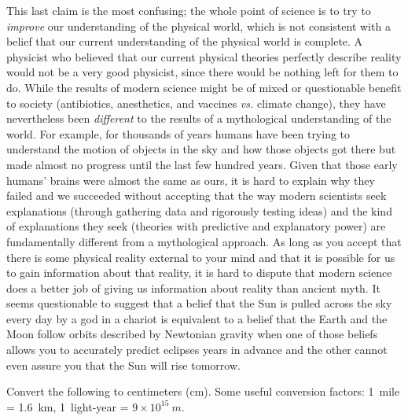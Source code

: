 \documentclass[12pt]{exam}
\begin{document}
\begin{questions}
\begin{TheSolution}
This last claim is the most confusing; the whole point of science is to try to \textit{improve} our understanding of the physical world, which is not consistent with a belief that our current understanding of the physical world is complete. A physicist who believed that our current physical theories perfectly describe reality would not be a very good physicist, since there would be nothing left for them to do.
While the results of modern science might be of mixed or questionable benefit to society (antibiotics, anesthetics, and vaccines \textit{vs.} climate change), they have nevertheless been \textit{different} to the results of a mythological understanding of the world. For example, for thousands of years humans have been trying to understand the motion of objects in the sky and how those objects got there but made almost no progress until the last few hundred years. Given that those early humans' brains were almost the same as ours, it is hard to explain why they failed and we succeeded without accepting that the way modern scientists seek explanations (through gathering data and rigorously testing ideas) and the kind of explanations they seek (theories with predictive and explanatory power) are fundamentally different from a mythological approach. As long as you accept that there is some physical reality external to your mind and that it is possible for us to gain information about that reality, it is hard to dispute that modern science does a better job of giving us information about reality than ancient myth. It seems questionable to suggest that a belief that the Sun is pulled across the sky every day by a god in a chariot is equivalent to a belief that the Earth and the Moon follow orbits described by Newtonian gravity when one of those beliefs allows you to accurately predict eclipses years in advance and the other cannot even assure you that the Sun will rise tomorrow.
\end{TheSolution}

\question
	Convert the following to centimeters (cm). Some useful conversion factors: 1~mile = 1.6~km, 1~light-year = $9\times 10^{15}~m$.
	
\end{questions}
\end{document}
